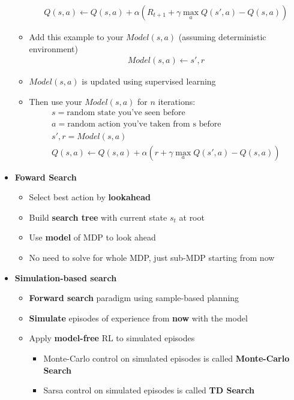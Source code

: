 \documentclass[12pt]{article}
\begin{document}
\begin{itemize}
\begin{itemize}
      \begin{gather*}
        Q(s,a) \leftarrow Q(s,a) + \alpha (R_{t+1} + \gamma\max\limits_aQ(s',a) - Q(s,a))
      \end{gather*}
      \item Add this example to your $Model(s,a)$ (assuming deterministic environment)
      \begin{gather*}
        Model(s,a) \leftarrow s', r
      \end{gather*}
      \item $Model(s,a)$ is updated using supervised learning
      \item Then use your $Model(s,a)$ for $n$ iterations:
      \begin{gather*}
        s = \mbox{random state you've seen before} \\
        a = \mbox{random action you've taken from s before} \\
        s', r = Model(s, a) \\
        Q(s, a) \leftarrow Q(s, a) + \alpha (r + \gamma\max\limits_aQ(s', a) - Q(s, a))
      \end{gather*}
    \end{itemize}
    \item \textbf{Foward Search}
    \begin{itemize}
      \item Select best action by \textbf{lookahead}
      \item Build \textbf{search tree} with current state $s_t$ at root
      \item Use \textbf{model} of MDP to look ahead
      \item No need to solve for whole MDP, just sub-MDP starting from now
    \end{itemize}
    \item \textbf{Simulation-based search}
    \begin{itemize}
      \item \textbf{Forward search} paradigm using sample-based planning
      \item \textbf{Simulate} episodes of experience from \textbf{now} with the model
      \item Apply \textbf{model-free} RL to simulated episodes
      \begin{itemize}
        \item Monte-Carlo control on simulated episodes is called \textbf{Monte-Carlo Search}
        \item Sarsa control on simulated episodes is called \textbf{TD Search}

\end{itemize}
\end{itemize}
\end{itemize}
\end{document}
